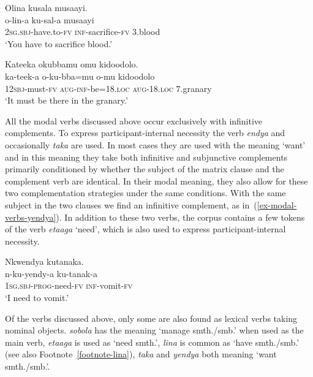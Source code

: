 \ea \label{ex-modal-verbs-other}
\begin{xlist}
\ex \label{ex-modal-verbs-lin}
	\glll Olina			kusala		musaayi.\\
	  o-lin-a			ku-sal-a		musaayi\\
		2\textsc{sg.sbj}-have.to-\textsc{fv}	\textsc{inf}-sacrifice-\textsc{fv}	3.blood\\
	\glt ‘You have to sacrifice blood.’

\ex \label{ex-modal-verbs-tekw}
	\glll Kateeka 	okubbamu		omu		kidoodolo.\\
	 ka-teek-a 	o-ku-bba=mu		o-mu		kidoodolo\\
		1\textsc{2sbj}-must-\textsc{fv}	\textsc{aug}-\textsc{inf}-be=18.\textsc{loc}	\textsc{aug}-18.\textsc{loc}	7.granary\\
	\glt ‘It must be there in the granary.’
	\end{xlist}
\z

All the modal verbs discussed above occur exclusively with infinitive complements. 
To express participant-internal necessity the verb \emph{endya} and occasionally \emph{taka} are used. 
In most cases they are used with the meaning ‘want’ and in this meaning they take both infinitive and subjunctive complements primarily conditioned by whether the subject of the matrix clause and the complement verb are identical. 
In their modal meaning, they also allow for these two complementation strategies under the same conditions. 
With the same subject in the two clauses we find an infinitive complement, as in~(\ref{ex-modal-verbs-yendya}).
In addition to these two verbs, the corpus contains a few tokens of the verb \emph{etaaga} ‘need’, which is also used to express participant-internal necessity. 

\ea \label{ex-modal-verbs-yendya}
	\glll Nkwendya kutanaka.\\
	  n-ku-yendy-a			ku-tanak-a\\
		\textsc{1sg.sbj}-\textsc{prog}-need-\textsc{fv}		\textsc{inf}-vomit-\textsc{fv}\\
	\glt ‘I need to vomit.’
\z

Of the verbs discussed above, only some are also found as lexical verbs taking nominal objects. 
\emph{sobola} has the meaning ‘manage smth./smb.’ when used as the main verb, 
\emph{etaaga} is used as ‘need smth.’, \emph{lina} is common as ‘have smth./smb.’ (see also Footnote~\ref{footnote-lina}),  \emph{taka} and \emph{yendya} both meaning ‘want smth./smb.’.



